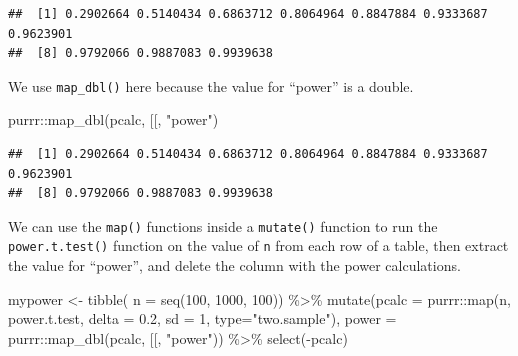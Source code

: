 \documentclass[
  oneside]{book}
\newenvironment{Shaded}{\begin{snugshade}}{\end{snugshade}}
\newcommand{\AttributeTok}[1]{\textcolor[rgb]{0.77,0.63,0.00}{#1}}
\newcommand{\DecValTok}[1]{\textcolor[rgb]{0.00,0.00,0.81}{#1}}
\newcommand{\FloatTok}[1]{\textcolor[rgb]{0.00,0.00,0.81}{#1}}
\newcommand{\FunctionTok}[1]{\textcolor[rgb]{0.00,0.00,0.00}{#1}}
\newcommand{\NormalTok}[1]{#1}
\newcommand{\OtherTok}[1]{\textcolor[rgb]{0.56,0.35,0.01}{#1}}
\newcommand{\SpecialCharTok}[1]{\textcolor[rgb]{0.00,0.00,0.00}{#1}}
\newcommand{\StringTok}[1]{\textcolor[rgb]{0.31,0.60,0.02}{#1}}
\begin{document}
\begin{verbatim}
##  [1] 0.2902664 0.5140434 0.6863712 0.8064964 0.8847884 0.9333687 0.9623901
##  [8] 0.9792066 0.9887083 0.9939638
\end{verbatim}

We use \texttt{map\_dbl()} here because the value for ``power'' is a double.

\begin{Shaded}
\begin{Highlighting}[]
\NormalTok{purrr}\SpecialCharTok{::}\FunctionTok{map\_dbl}\NormalTok{(pcalc, }\StringTok{\textasciigrave{}}\AttributeTok{[[}\StringTok{\textasciigrave{}}\NormalTok{, }\StringTok{"power"}\NormalTok{)}
\end{Highlighting}
\end{Shaded}

\begin{verbatim}
##  [1] 0.2902664 0.5140434 0.6863712 0.8064964 0.8847884 0.9333687 0.9623901
##  [8] 0.9792066 0.9887083 0.9939638
\end{verbatim}

We can use the \texttt{map()} functions inside a \texttt{mutate()} function to run the \texttt{power.t.test()} function on the value of \texttt{n} from each row of a table, then extract the value for ``power'', and delete the column with the power calculations.

\begin{Shaded}
\begin{Highlighting}[]
\NormalTok{mypower }\OtherTok{\textless{}{-}} \FunctionTok{tibble}\NormalTok{(}
  \AttributeTok{n =} \FunctionTok{seq}\NormalTok{(}\DecValTok{100}\NormalTok{, }\DecValTok{1000}\NormalTok{, }\DecValTok{100}\NormalTok{)) }\SpecialCharTok{\%\textgreater{}\%}
  \FunctionTok{mutate}\NormalTok{(}\AttributeTok{pcalc =}\NormalTok{ purrr}\SpecialCharTok{::}\FunctionTok{map}\NormalTok{(n, power.t.test, }
                            \AttributeTok{delta =} \FloatTok{0.2}\NormalTok{, }
                            \AttributeTok{sd =} \DecValTok{1}\NormalTok{, }
                            \AttributeTok{type=}\StringTok{"two.sample"}\NormalTok{),}
         \AttributeTok{power =}\NormalTok{ purrr}\SpecialCharTok{::}\FunctionTok{map\_dbl}\NormalTok{(pcalc, }\StringTok{\textasciigrave{}}\AttributeTok{[[}\StringTok{\textasciigrave{}}\NormalTok{, }\StringTok{"power"}\NormalTok{)) }\SpecialCharTok{\%\textgreater{}\%}
  \FunctionTok{select}\NormalTok{(}\SpecialCharTok{{-}}\NormalTok{pcalc)}
\end{Highlighting}
\end{Shaded}
\end{document}
